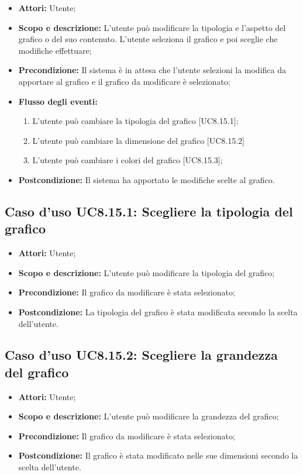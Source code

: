 \begin{itemize}
	\item \textbf{Attori:} Utente;
	\item \textbf{Scopo e descrizione:} L'utente può modificare la tipologia e l'aspetto del grafico o del suo contenuto. L'utente seleziona il grafico e poi sceglie che modifiche effettuare;
	\item \textbf{Precondizione:} Il sistema è in attesa che l'utente selezioni la modifica da apportare al grafico e il grafico da modificare è selezionato;
	\item \textbf{Flusso degli eventi:}
	\begin{enumerate}
		\item L'utente può cambiare la tipologia del grafico [UC8.15.1];
		\item L'utente può cambiare la dimensione del grafico [UC8.15.2]
		\item L'utente può cambiare i colori del grafico [UC8.15.3];
	\end{enumerate}
	\item \textbf{Postcondizione:} Il sistema ha apportato le modifiche scelte al grafico.
\end{itemize}

\subsection{Caso d'uso UC8.15.1: Scegliere la tipologia del grafico}
\begin{itemize}
	\item \textbf{Attori:} Utente;
	\item \textbf{Scopo e descrizione:} L'utente può modificare la tipologia del grafico;
	\item \textbf{Precondizione:} Il grafico da modificare è stata selezionato;
	\item \textbf{Postcondizione:} La tipologia del grafico è stata modificata secondo la scelta dell'utente.
\end{itemize}

\subsection{Caso d'uso UC8.15.2: Scegliere la grandezza del grafico}
\begin{itemize}
	\item \textbf{Attori:} Utente;
	\item \textbf{Scopo e descrizione:} L'utente può modificare la grandezza del grafico;
	\item \textbf{Precondizione:} Il grafico da modificare è stata selezionato;
	\item \textbf{Postcondizione:} Il grafico è stata modificato nelle sue dimensioni secondo la scelta dell'utente.
\end{itemize}

